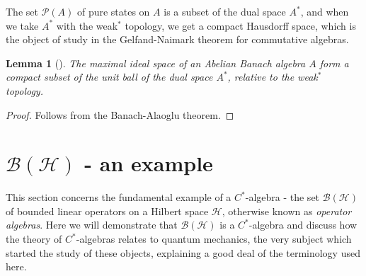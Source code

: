 \documentclass[12pt,a4paper]{report}
\theoremstyle{plain}
\newtheorem{lemma}{Lemma}
\theoremstyle{definition}
\newcommand{\1}{\mathbbm{1}}
\newcommand{\C}{\mathbb{C}}
\renewcommand{\H}{\mathcal{H}}
\newcommand{\B}{\mathcal{B}}
\renewcommand{\P}[1]{\mathscr{P}(#1)}
\begin{document}
The set $\P A$ of pure states on $A$ is a subset of the dual space $A^\ast$, and when we take $A^\ast$ with the weak$^\ast$ topology, we get a compact Hausdorff space, which is the object of study in the Gelfand-Naimark theorem for commutative algebras.

\begin{lemma}[{\cite[3.2.20]{kadison83}}]\label{lemma:3220}
	The maximal ideal space of an Abelian Banach algebra $A$ form a compact subset of the unit ball of 
	the dual space $A^\ast$, relative to the weak$^\ast$ topology.
\end{lemma}
\begin{proof}
	Follows from the Banach-Alaoglu theorem.
\end{proof}




\section{$\B(\H)$ - an example}
This section concerns the fundamental example of a $C^\ast$-algebra - the set $\B(\H)$ of bounded 
linear operators on a Hilbert space $\H$, otherwise known as \emph{operator algebras}. Here we will 
demonstrate that $\B(\H)$ is a $C^\ast$-algebra and discuss how the theory of $C^\ast$-algebras relates 
to quantum mechanics, the very subject which started the study of these objects, explaining a good deal 
of the terminology used here. 


\end{document}
